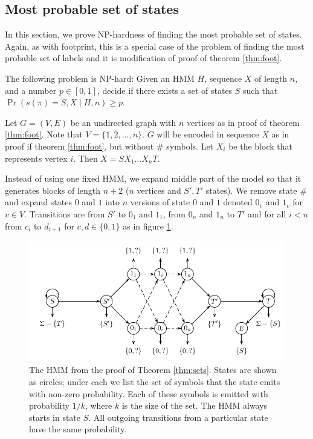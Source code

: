 \subsection{Most probable set of states}
\begin{reformulate*}
In this section, we prove NP-hardness of finding the most probable set of
states. Again, as with footprint, this is a special case of the problem of
finding the most probable set of labels and it is modification of proof of
theorem \ref{thm:foot}. 


\begin{theorem}The following problem is NP-hard:
Given an HMM $H$, sequence $X$ of length $n$, and a number $p\in [0,1]$,
decide if there exists a set of states $S$ such that 
$\Pr\left(s(\pi)=S, X\mid H, n \right)\geq p$.
\end{theorem}\label{thm:sets}

Let $G=(V,E)$ be an undirected graph with $n$ vertices as in proof of theorem
\ref{thm:foot}. Note that $V = \{1, 2, \dots, n\}$. $G$ will be encoded in
sequence $X$ as in proof if theorem \ref{thm:foot}, but without $\#$ symbols.
Let $X_i$ be the block that represents vertex $i$. Then $X=SX_1\dots X_nT$.

Instead of using one fixed HMM, we expand middle part of the model so that it
generates blocks of length $n+2$ ($n$ vertices and $S', T'$ states). We remove
state $\#$ and expand states $0$ and $1$ into $n$ versions of state $0$ and $1$
denoted $0_v$ and $1_v$ for $v \in V$.  Transitions are from $S'$ to $0_1$ and
$1_1$, from $0_n$ and $1_n$ to $T'$ and for all $i<n$ from $c_i$ to $d_{i+1}$
for $c,d\in \{0, 1\}$ as in figure  \ref{fig:set_hmm2}. 

\end{reformulate*}
\begin{figure}[t]
\centerline{\includegraphics[scale=0.68]{../figures/jcss/expandedcliquehmm.pdf}}
\caption{\label{fig:set_hmm2} The HMM from the proof of Theorem
  \ref{thm:sets}. States are shown as circles; under each we
  list the set of symbols that the state emits with non-zero
  probability. Each of these symbols is emitted with probability
  $1/k$, where $k$ is the size of the set. The HMM always starts in
  state $S$. All outgoing transitions from a particular state have
  the same probability.}
\end{figure}

